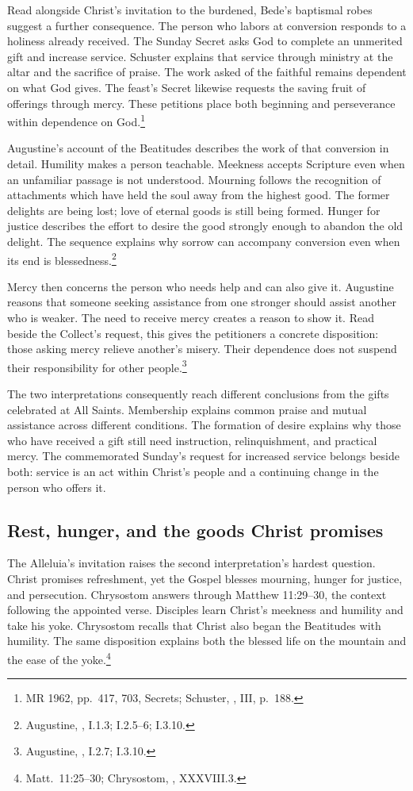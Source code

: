 Read alongside Christ's invitation to the burdened, Bede's baptismal
robes suggest a further consequence. The person who labors at conversion
responds to a holiness already received. The Sunday Secret asks God
to complete an unmerited gift and increase service. Schuster explains
that service through ministry at the altar and the sacrifice of praise.
The work asked of the faithful remains dependent on what God gives.
The feast's Secret likewise requests the saving fruit of offerings
through mercy. These petitions place both beginning and perseverance
within dependence on God.\footnote{MR 1962, pp.~417, 703,
Secrets; Schuster, , III, p.~188.}

Augustine's account of the Beatitudes describes the work of that
conversion in detail. Humility makes a person teachable. Meekness
accepts Scripture even when an unfamiliar passage is not understood.
Mourning follows the recognition of attachments which have held the
soul away from the highest good. The former delights are being lost;
love of eternal goods is still being formed. Hunger for justice
describes the effort to desire the good strongly enough to abandon
the old delight. The sequence explains why sorrow can accompany
conversion even when its end is blessedness.\footnote{Augustine,
, I.1.3; I.2.5--6; I.3.10.}

Mercy then concerns the person who needs help and can also give it.
Augustine reasons that someone seeking assistance from one stronger
should assist another who is weaker. The need to receive mercy
creates a reason to show it. Read beside the Collect's request,
this gives the petitioners a concrete disposition: those asking
mercy relieve another's misery. Their dependence does not suspend
their responsibility for other people.\footnote{Augustine,
, I.2.7; I.3.10.}

The two interpretations consequently reach different conclusions
from the gifts celebrated at All Saints. Membership explains
common praise and mutual assistance across different conditions.
The formation of desire explains why those who have received a gift
still need instruction, relinquishment, and practical mercy.
The commemorated Sunday's request for increased service belongs
beside both: service is an act within Christ's people and a
continuing change in the person who offers it.

\subsection{Rest, hunger, and the goods Christ promises}
The Alleluia's invitation raises the second interpretation's hardest
question. Christ promises refreshment, yet the Gospel blesses mourning,
hunger for justice, and persecution. Chrysostom answers through
Matthew 11:29--30, the context following the appointed verse.
Disciples learn Christ's meekness and humility and take his yoke.
Chrysostom recalls that Christ also began the Beatitudes with
humility. The same disposition explains both the blessed life
on the mountain and the ease of the yoke.\footnote{Matt.~11:25--30;
Chrysostom, , XXXVIII.3.}

